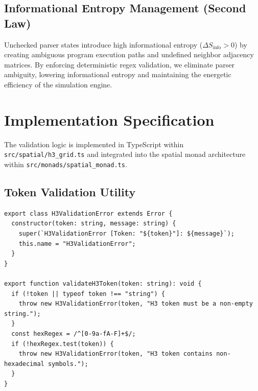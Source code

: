 \documentclass[11pt, a4paper]{article}
\begin{document}
\subsection{Informational Entropy Management (Second Law)}
Unchecked parser states introduce high informational entropy ($\Delta S_{\text{info}} > 0$) by creating ambiguous program execution paths and undefined neighbor adjacency matrices. By enforcing deterministic regex validation, we eliminate parser ambiguity, lowering informational entropy and maintaining the energetic efficiency of the simulation engine.

\section{Implementation Specification}
The validation logic is implemented in TypeScript within \texttt{src/spatial/h3\_grid.ts} and integrated into the spatial monad architecture within \texttt{src/monads/spatial\_monad.ts}.

\subsection{Token Validation Utility}
\begin{lstlisting}
export class H3ValidationError extends Error {
  constructor(token: string, message: string) {
    super(`H3ValidationError [Token: "${token}"]: ${message}`);
    this.name = "H3ValidationError";
  }
}

export function validateH3Token(token: string): void {
  if (!token || typeof token !== "string") {
    throw new H3ValidationError(token, "H3 token must be a non-empty string.");
  }
  const hexRegex = /^[0-9a-fA-F]+$/;
  if (!hexRegex.test(token)) {
    throw new H3ValidationError(token, "H3 token contains non-hexadecimal symbols.");
  }
}
\end{lstlisting}
\end{document}
